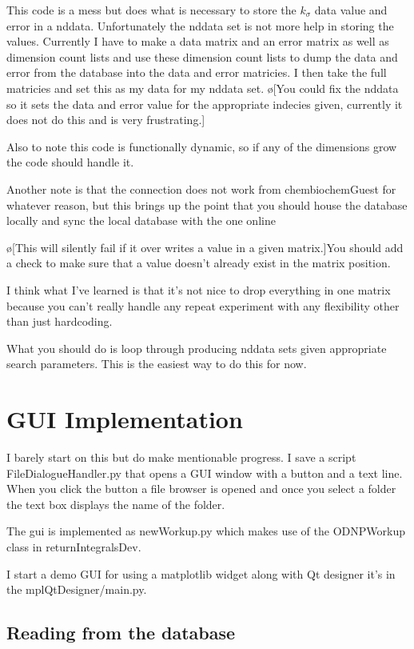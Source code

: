\documentclass[10pt]{book}
\begin{document}
This code is a mess but does what is necessary to store the $k_{\sigma}$ data value and error in a nddata. Unfortunately the nddata set is not more help in storing the values. Currently I have to make a data matrix and an error matrix as well as dimension count lists and use these dimension count lists to dump the data and error from the database into the data and error matricies. I then take the full matricies and set this as my data for my nddata set. \o[You could fix the nddata so it sets the data and error value for the appropriate indecies given, currently it does not do this and is very frustrating.]{}

Also to note this code is functionally dynamic, so if any of the dimensions grow the code should handle it.

Another note is that the connection does not work from chembiochemGuest for whatever reason, but this brings up the point that you should house the database locally and sync the local database with the one online 

\o[This will silently fail if it over writes a value in a given matrix.]{You should add a check to make sure that a value doesn't already exist in the matrix position.}

I think what I've learned is that it's not nice to drop everything in one matrix because you can't really handle any repeat experiment with any flexibility other than just hardcoding.

What you should do is loop through producing nddata sets given appropriate search parameters. This is the easiest way to do this for now. 

\chapter{GUI Implementation}

I barely start on this but do make mentionable progress. I save a script FileDialogueHandler.py that opens a GUI window with a button and a text line. When you click the button a file browser is opened and once you select a folder the text box displays the name of the folder.

The gui is implemented as newWorkup.py which makes use of the ODNPWorkup class in returnIntegralsDev.


I start a demo GUI for using a matplotlib widget along with Qt designer it's in the mplQtDesigner/main.py.


\section{Reading from the database}
\end{document}
